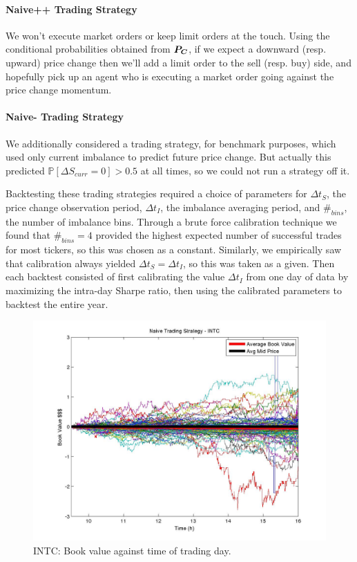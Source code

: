 \paragraph{Naive++ Trading Strategy} We won't execute market orders or keep limit orders at the touch. Using the conditional probabilities obtained from $\boldsymbol{P_C}$, if we expect a downward (resp. upward) price change then we'll add a limit order to the sell (resp. buy) side, and hopefully pick up an agent who is executing a market order going against the price change momentum. 

\paragraph{Naive- Trading Strategy} We additionally considered a trading strategy, for benchmark purposes, which used only current imbalance to predict future price change. But actually this predicted $\mathbb{P} \left[ \Delta S_{curr} = 0 \right] > 0.5$ at all times, so we could not run a strategy off it.

Backtesting these trading strategies required a choice of parameters for $\Delta t_S$, the price change observation period, $\Delta t_I$, the imbalance averaging period, and $\#_{bins}$, the number of imbalance bins. Through a brute force calibration technique we found that $\#_{bins} = 4$ provided the highest expected number of successful trades for most tickers, so this was chosen as a constant. Similarly, we empirically saw that calibration always yielded $\Delta t_S = \Delta t_I$, so this was taken as a given. Then each backtest consisted of first calibrating the value $\Delta t_I$ from one day of data by maximizing the intra-day Sharpe ratio, then using the calibrated parameters to backtest the entire year.

\begin{figure}
  \includegraphics[width=\textwidth]{Figs/fig-INTC-year-bookvals}
  \caption{INTC: Book value against time of trading day.}
\end{figure}

